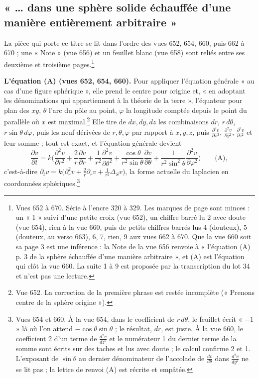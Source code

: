 \documentclass[11pt,a4paper]{article}
\begin{document}
\subsection*{« … dans une sphère solide échauffée d'une manière entièrement arbitraire »}

La pièce qui porte ce titre se lit dans l'ordre des vues 652, 654, 660, puis
662 à 670 ; une « Note » (vue 656) et un feuillet blanc (vue 658) sont reliés
entre ses deuxième et troisième pages.\footnote{Vues 652 à 670. Série à
l'encre 320 à 329. Les marques de page sont minces : un « 1 » suivi d'une
petite croix (vue 652), un chiffre barré lu 2 avec doute (vue 654), rien à la
vue 660, puis de petits chiffres barrés lus 4 (douteux), 5 (douteux, au verso
663), 6, 7, rien, 9 aux vues 662 à 670. Que la vue 660 soit sa page 3 est une
inférence : la Note de la vue 656 renvoie à « l'équation (A) p. 3 de la sphère
échauffée d'une manière arbitraire », et (A) est l'équation qui clôt la vue
660. La suite 1 à 9 est proposée par la transcription du lot 34 et n'est pas
une lecture.}

\textbf{L'équation (A) (vues 652, 654, 660).} Pour appliquer l'équation générale
« au cas d'une figure sphérique », elle prend le centre pour origine et,
« en adoptant les dénominations qui appartiennent à la théorie de la terre »,
l'équateur pour plan des $xy$, $\theta$ l'arc du pôle au point, $\varphi$ la
longitude comptée depuis le point du parallèle où $x$ est
maximal.\footnote{Vue 652. La correction de la première phrase est restée
incomplète (« Prenons centre de la sphère origine »).} Elle tire de $dx, dy,
dz$ les combinaisons $dr$, $r\,d\theta$, $r\sin\theta\,d\varphi$, puis les neuf
dérivées de $r, \theta, \varphi$ par rapport à $x, y, z$, puis
$\frac{\partial^2 v}{\partial x^2}$, $\frac{\partial^2 v}{\partial y^2}$,
$\frac{\partial^2 v}{\partial z^2}$ et leur somme ; tout est exact, et
l'équation générale devient
\[
\frac{\partial v}{\partial t} = k\Big(\frac{\partial^2 v}{\partial r^2}
+ \frac2r\frac{\partial v}{\partial r} + \frac{1}{r^2}\frac{\partial^2
v}{\partial\theta^2} + \frac{\cos\theta}{r^2\sin\theta}\frac{\partial
v}{\partial\theta} + \frac{1}{r^2\sin^2\theta}\frac{\partial^2
v}{\partial\varphi^2}\Big) \qquad \text{(A)},
\]
c'est-à-dire $\partial_t v = k\big(\partial_r^2 v + \frac2r\partial_r v +
\frac{1}{r^2}\Delta_S v\big)$, la forme actuelle du laplacien en coordonnées
sphériques.\footnote{Vues 654 et 660. À la vue 654, dans le coefficient de
$r\,d\theta$, le feuillet écrit « $-1$ » là où l'on attend
$-\cos\theta\sin\theta$ ; le résultat, $dr$, est juste. À la vue 660, le
coefficient 2 d'un terme de $\frac{d^2v}{dz^2}$ et le numérateur 1 du dernier
terme de la somme sont écrits sur des taches et lus avec doute ; le calcul
confirme 2 et 1. L'exposant de $\sin\theta$ au dernier dénominateur de
l'accolade de $\frac{dv}{d\theta}$ dans $\frac{d^2v}{dy^2}$ ne se lit pas ; la
lettre de renvoi (A) est récrite et empâtée.}
\end{document}
